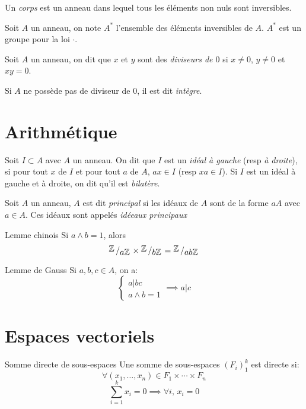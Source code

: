 \documentclass[french, a4paper, 11pt, twocolumn]{article}
\newcommand{\bigslant}[2]{{\raisebox{.2em}{$#1$}\left/\raisebox{-.2em}{$#2$}\right.}}
\newcommand{\Z}{\mathbb{Z}}   %
\begin{document}
\begin{definition}
  Un \emph{corps} est un anneau dans lequel tous les éléments non nuls sont inversibles.

  Soit $A$ un anneau, on note $A^{*}$ l'ensemble des éléments inversibles de $A$. $A^{*}$ est un groupe pour la loi $\cdot$.
\end{definition}

\begin{definition}
  Soit $A$ un anneau, on dit que $x$ et $y$ sont des \emph{diviseurs de $0$} si $x\neq 0$, $y\neq 0$ et $xy=0$.

  Si $A$ ne possède pas de diviseur de $0$, il est dit \emph{intègre}.
\end{definition}

\section{Arithmétique}
\begin{definition}
  Soit $I\subset A$ avec $A$ un anneau. On dit que $I$ est un \emph{idéal à gauche} (resp \emph{à droite}), si pour tout $x$ de $I$ et pour tout $a$ de $A$, $ax\in I$ (resp $xa \in I$). Si $I$ est un idéal à gauche et à droite, on dit qu'il est \emph{bilatère}.
\end{definition}

\begin{definition}
  Soit $A$ un anneau, $A$ est dit \emph{principal} si les idéaux de $A$ sont de la forme $aA$ avec $a\in A$. Ces idéaux sont appelés \emph{idéeaux principaux}
\end{definition}

\begin{theoreme}{Lemme chinois}
  Si $a \wedge b = 1$, alors
  \[\bigslant{\Z}{a\Z}\times\bigslant{\Z}{b\Z} = \bigslant{\Z}{ab\Z}\]
\end{theoreme}

\begin{theoreme}{Lemme de Gauss}
  Si $a,b,c\in A$, on a:
  \[\begin{cases}
      a|bc\\
      a\wedge b = 1
    \end{cases}\implies a|c\]
\end{theoreme}

\section{Espaces vectoriels}
\begin{theoreme}{Somme directe de sous-espaces}
  Une somme de sous-espaces $(F_{i})_{1}^{k}$ est directe si:
  \[\forall (x_{1},\ldots,x_{n}) \in F_{1}\times \cdots\times F_{n}\]
  \[\sum_{i=1}^k x_{i} = 0 \implies \forall i,\, x_{i}=0\]
\end{theoreme}
\end{document}
